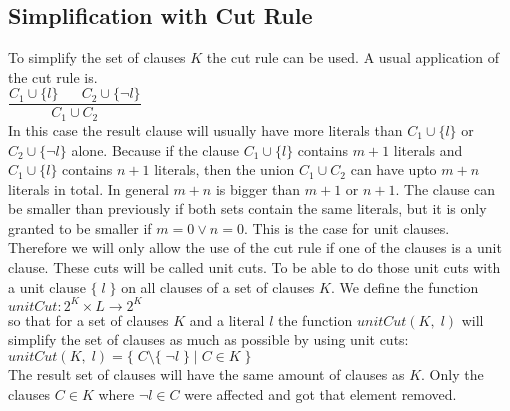 \subsection{Simplification with Cut Rule} %
To simplify the set of clauses $K$ the cut rule can be used. A usual application of the cut rule is.
\\
\hspace*{1.3cm}
$\dfrac{C_1 \cup \{ l \} \;\;\;\;\;\; C_2 \cup \{ \neg l \}}{C_1 \cup C_2}$
\\[0.2cm]
In this case the result clause will usually have more literals than $C_1 \cup \{ l \}$ or $C_2 \cup \{ \neg l \}$ alone. Because if the clause $C_1 \cup \{ l \}$ contains $m + 1$ literals and $C_1 \cup \{ l \}$ contains $n + 1$ literals, then the union $C_1 \cup C_2$ can have upto $m + n$ literals in total. In general $m + n$ is bigger than $m + 1$ or $n + 1$. The clause can be smaller than previously if both sets contain the same literals, but it is only granted to be smaller if $m = 0 \lor n = 0$. This is the case for unit clauses. Therefore we will only allow the use of the cut rule if one of the clauses is a unit clause. These cuts will be called unit cuts. To be able to do those unit cuts with a unit clause $\{\; l\; \}$ on all clauses of a set of clauses $K$. We define the function
\\
\hspace*{1.3cm}
$unitCut: 2^{K} \times L \to 2^{K}$
\\[0.2cm]
so that for a set of clauses $K$ and a literal $l$ the function $unitCut(K,\; l)$ will simplify the set of clauses as much as possible by using unit cuts:
\\
\hspace*{1.3cm}
$unitCut(K,\; l) = \{\; C \setminus \{\; \neg l\; \}\; |\; C \in K\; \}$
\\[0.2cm]
The result set of clauses will have the same amount of clauses as $K$. Only the clauses $C \in K$ where $\neg l \in C$ were affected and got that element removed. \cite{Stroetman2019}

